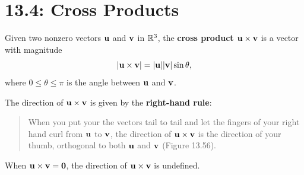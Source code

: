 \documentclass[../mathNotesPreamble]{subfiles}
\begin{document}
\section{13.4: Cross Products}
  \begin{defn*}
    Given two nonzero vectors ${\mathbf{u}}$ and ${\mathbf{v}}$ in $\mathbb{R}^3$, the \textbf{cross product ${\mathbf{u}}\times{\mathbf{v}}$} is a vector with magnitude
      \[{\left\vert{\mathbf{u}}\times {\mathbf{v}}\right\vert}={\left\vert{\mathbf{u}}\right\vert}{\left\vert{\mathbf{v}}\right\vert}\sin\theta,\]
    where $0\leq \theta\leq \pi$ is the angle between ${\mathbf{u}}$ and ${\mathbf{v}}$. 

    The direction of ${\mathbf{u}}\times{\mathbf{v}}$ is given by the \textbf{right-hand rule}: 
    \begin{quote}
      When you put your the vectors tail to tail and let the fingers of your right hand curl from ${\mathbf{u}}$ to ${\mathbf{v}}$, the direction of ${\mathbf{u}} \times{\mathbf{v}}$ is the direction of your thumb, orthogonal to both ${\mathbf{u}}$ and ${\mathbf{v}}$ (Figure 13.56).
    \end{quote}
    
    When ${\mathbf{u}}\times {\mathbf{v}}=\mathbf{0}$, the direction of ${\mathbf{u}}\times{\mathbf{v}}$ is undefined.
  \end{defn*}
\end{document}
